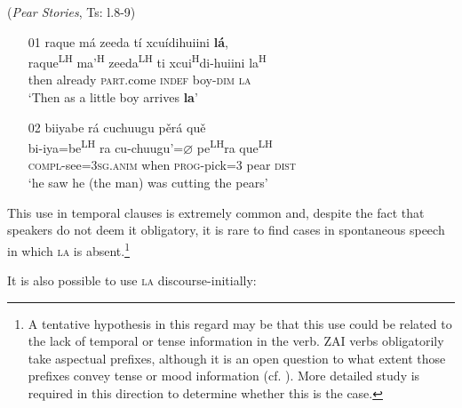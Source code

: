 \ea\label{temporal2} (\textit{Pear Stories}, Ts: l.8-9)
\begin{itemize}
\item[01]
\glll raque m\'{a} zeeda t\'{i} xcu\'{i}dihuiini \textbf{l\'{a}},  \\
raque\textsuperscript{LH} ma'\textsuperscript{H} zeeda\textsuperscript{LH} ti xcui\textsuperscript{H}di-huiini la\textsuperscript{H}  \\
then already \textsc{part}.come \textsc{indef} boy-\textsc{dim} \textsc{la}  \\
\glt `Then as a little boy arrives \textbf{la}'  


\item[02]
\glll biiyabe r\'{a} cuchuugu p\v{e}r\'{a} qu\v{e}  \\
bi-iya=be\textsuperscript{LH} ra cu-chuugu'=$\varnothing$ pe\textsuperscript{LH}ra que\textsuperscript{LH}  \\
\textsc{compl}-see=3\textsc{sg.anim} when \textsc{prog}-pick=3 pear \textsc{dist}  \\
\glt `he saw he (the man) was cutting the pears' 

\end{itemize}
\z
This use in temporal clauses is extremely common and, despite the fact that speakers do not deem it obligatory, it is rare to find cases in spontaneous speech in which \textsc{la} is absent.\footnote{A tentative hypothesis in this regard may be that this use could be related to the lack of temporal or tense information in the verb. ZAI verbs obligatorily take aspectual prefixes, although it is an open question to what extent those prefixes convey tense or mood information (cf. ). More detailed study is required in this direction to determine whether this is the case.}

It is also possible to use \textsc{la} discourse-initially:

